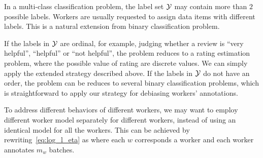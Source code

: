 In a multi-class classification problem, 
the label set ${\mathcal{Y}}$ may contain more than $2$ possible labels.  
Workers are usually requested to assign data items with different labels.  
This is a natural extension from binary classification problem.  

If the labels in ${\mathcal{Y}}$ are ordinal, 
for example, judging whether a review is ``very helpful'', ``helpful'' or ``not helpful'', 
the problem reduces to a rating estimation problem, 
where the possible value of rating are discrete values.  
We can simply apply the extended strategy described above.  
If the labels in ${\mathcal{Y}}$ do not have an order, 
the problem can be reduces to several binary classification problems, 
which is straightforward to apply our strategy for debiasing workers' annotations.  


To address different behaviors of different workers, 
we may want to employ different worker model separately for different workers, 
instead of using an identical model for all the workers.  
This can be achieved by rewriting~\eqref{eq:log_l_eta} as 
%
where each $w$ corresponds a worker and each worker annotates $m_w$ batches.  




